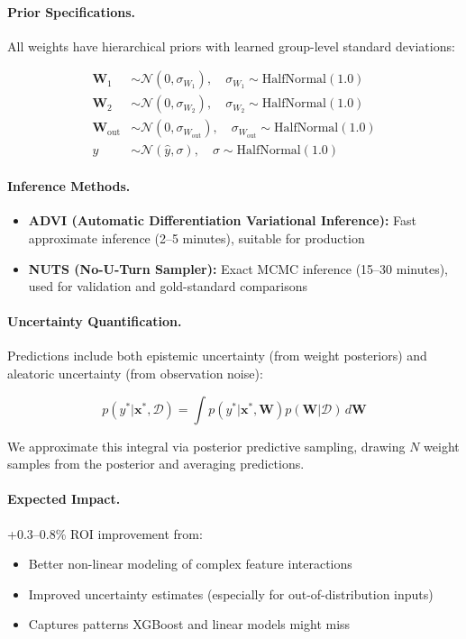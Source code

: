 \documentclass[12pt]{report}  %
\numberwithin{equation}{section}
\theoremstyle{plain}
\theoremstyle{definition}
\theoremstyle{remark}
\begin{document}
\paragraph{Prior Specifications.}
All weights have hierarchical priors with learned group-level standard deviations:

\begin{align}
\mathbf{W}_1 &\sim \mathcal{N}(0, \sigma_{W_1}), \quad \sigma_{W_1} \sim \text{HalfNormal}(1.0) \\
\mathbf{W}_2 &\sim \mathcal{N}(0, \sigma_{W_2}), \quad \sigma_{W_2} \sim \text{HalfNormal}(1.0) \\
\mathbf{W}_{\text{out}} &\sim \mathcal{N}(0, \sigma_{W_{\text{out}}}), \quad \sigma_{W_{\text{out}}} \sim \text{HalfNormal}(1.0) \\
y &\sim \mathcal{N}(\hat{y}, \sigma), \quad \sigma \sim \text{HalfNormal}(1.0)
\end{align}

\paragraph{Inference Methods.}
\begin{itemize}
  \item \textbf{ADVI (Automatic Differentiation Variational Inference):} Fast approximate inference (2--5 minutes), suitable for production
  \item \textbf{NUTS (No-U-Turn Sampler):} Exact MCMC inference (15--30 minutes), used for validation and gold-standard comparisons
\end{itemize}

\paragraph{Uncertainty Quantification.}
Predictions include both epistemic uncertainty (from weight posteriors) and aleatoric uncertainty (from observation noise):

\begin{equation}
p(y^* | \mathbf{x}^*, \mathcal{D}) = \int p(y^* | \mathbf{x}^*, \mathbf{W}) p(\mathbf{W} | \mathcal{D}) \, d\mathbf{W}
\end{equation}

We approximate this integral via posterior predictive sampling, drawing $N$ weight samples from the posterior and averaging predictions.

\paragraph{Expected Impact.}
+0.3--0.8\% ROI improvement from:
\begin{itemize}
  \item Better non-linear modeling of complex feature interactions
  \item Improved uncertainty estimates (especially for out-of-distribution inputs)
  \item Captures patterns XGBoost and linear models might miss
\end{itemize}
\end{document}
